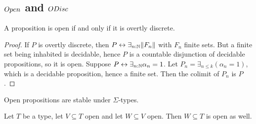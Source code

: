 
\subsection{$\Open$ and $\ODisc$} %
\begin{lemma}\label{PropOpenIffOdisc}
  A proposition is open if and only if it is overtly discrete.
\end{lemma}
\begin{proof}
  If $P$ is overtly discrete, then $P\leftrightarrow \exists_{n:\mathbb{N}} \lVert F_n \rVert$ with $F_n$ finite sets. 
  But a finite set being inhabited is decidable, hence $P$ is a countable disjunction of decidable propositions, so it is open.
  Suppose $P\leftrightarrow \exists_{n:\mathbb{N}} \alpha_n = 1$. 
  Let $P_n = \exists_{n\leq k} (\alpha_n = 1)$, which is a decidable proposition, hence a finite set. 
  Then the colimit of $P_n$ is $P$. 
\end{proof}

\begin{corollary}\label{OpenDependentSums}
  Open propositions are stable under $\Sigma$-types. 
\end{corollary}
\begin{corollary}\label{OpenTransitive}
  Let $T$ be a type, let $V\subseteq T$ open and let $W\subseteq V$ open. 
  Then $W\subseteq T$ is open as well. 
\end{corollary}

